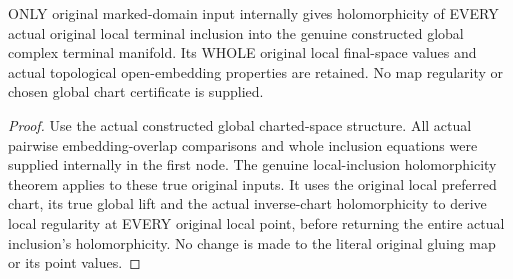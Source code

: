 \begin{theorem}
\label{hir:original-input-global-terminal-local-inclusion-holomorphic}
\leanok
{}
ONLY original marked-domain input internally gives holomorphicity of EVERY
actual original local terminal inclusion into the genuine constructed
global complex terminal manifold. Its WHOLE original local final-space
values and actual topological open-embedding properties are retained.
No map regularity or chosen global chart certificate is supplied.
\end{theorem}
\begin{proof}
Use the actual constructed global charted-space structure. All actual
pairwise embedding-overlap comparisons and whole inclusion equations
were supplied internally in the first node. The genuine local-inclusion
holomorphicity theorem applies to these true original inputs. It uses
the original local preferred chart, its true global lift and the actual
inverse-chart holomorphicity to derive local regularity at EVERY original
local point, before returning the entire actual inclusion's holomorphicity.
No change is made to the literal original gluing map or its point values.
\end{proof}

